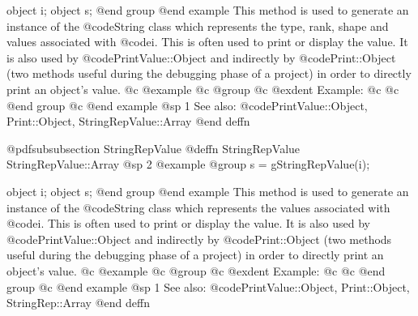 object  i;
object  s;
@end group
@end example
This method is used to generate an instance of the @code{String} class
which represents the type, rank, shape and values associated with
@code{i}.  This is often used to print or display the value.  It is also
used by @code{PrintValue::Object} and indirectly by @code{Print::Object}
(two methods useful during the debugging phase of a project) in order to
directly print an object's value.
@c @example
@c @group
@c @exdent Example:
@c 
@c @end group
@c @end example
@sp 1
See also:  @code{PrintValue::Object, Print::Object, StringRepValue::Array}
@end deffn






@pdfsubsubsection {StringRepValue}
@deffn {StringRepValue} StringRepValue::Array
@sp 2
@example
@group
s = gStringRepValue(i);

object  i;
object  s;
@end group
@end example
This method is used to generate an instance of the @code{String} class
which represents the values associated with @code{i}.  This is often
used to print or display the value.  It is also used by
@code{PrintValue::Object} and indirectly by @code{Print::Object}
(two methods useful during the debugging phase of a project)
in order to directly print an object's value.
@c @example
@c @group
@c @exdent Example:
@c 
@c @end group
@c @end example
@sp 1
See also:  @code{PrintValue::Object, Print::Object, StringRep::Array}
@end deffn







